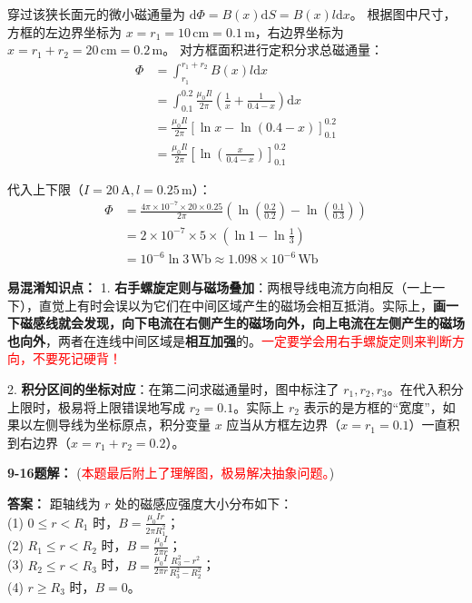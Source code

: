 穿过该狭长面元的微小磁通量为 $\mathrm{d}\Phi = B(x) \mathrm{d}S = B(x) l \mathrm{d}x$。
根据图中尺寸，方框的左边界坐标为 $x = r_1 = 10\,\text{cm} = 0.1\,\text{m}$，右边界坐标为 $x = r_1 + r_2 = 20\,\text{cm} = 0.2\,\text{m}$。
对方框面积进行定积分求总磁通量：
\begin{align*}
	\Phi &= \int_{r_1}^{r_1+r_2} B(x) l \mathrm{d}x \\
	&= \int_{0.1}^{0.2} \frac{\mu_0 I l}{2\pi} \left( \frac{1}{x} + \frac{1}{0.4-x} \right) \mathrm{d}x \\
	&= \frac{\mu_0 I l}{2\pi} \left[ \ln x - \ln(0.4-x) \right]_{0.1}^{0.2} \\
	&= \frac{\mu_0 I l}{2\pi} \left[ \ln\left(\frac{x}{0.4-x}\right) \right]_{0.1}^{0.2}
\end{align*}

代入上下限（$I = 20\,\text{A}, l = 0.25\,\text{m}$）：
\begin{align*}
	\Phi &= \frac{4\pi \times 10^{-7} \times 20 \times 0.25}{2\pi} \left( \ln\left(\frac{0.2}{0.2}\right) - \ln\left(\frac{0.1}{0.3}\right) \right) \\
	&= 2 \times 10^{-7} \times 5 \times (\ln 1 - \ln\frac{1}{3}) \\
	&= 10^{-6} \ln 3 \,\text{Wb} \approx 1.098 \times 10^{-6} \,\text{Wb}
\end{align*}

\textbf{易混淆知识点： }
1. \textbf{右手螺旋定则与磁场叠加}：两根导线电流方向相反（一上一下），直觉上有时会误以为它们在中间区域产生的磁场会相互抵消。实际上，\textbf{画一下磁感线就会发现，向下电流在右侧产生的磁场向外，向上电流在左侧产生的磁场也向外}，两者在连线中间区域是\textbf{相互加强}的。\textcolor{red}{一定要学会用右手螺旋定则来判断方向，不要死记硬背！}

2. \textbf{积分区间的坐标对应}：在第二问求磁通量时，图中标注了 $r_1, r_2, r_3$。在代入积分上限时，极易将上限错误地写成 $r_2=0.1$。实际上 $r_2$ 表示的是方框的“宽度”，如果以左侧导线为坐标原点，积分变量 $x$ 应当从方框左边界（$x=r_1=0.1$）一直积到右边界（$x=r_1+r_2=0.2$）。

\vspace{1em}

\textbf{9-16题解： }(\textcolor{red}{本题最后附上了理解图，极易解决抽象问题。})
\setcounter{equation}{0}
\renewcommand{\theHequation}{9-16.\arabic{equation}}

\textbf{答案： }
距轴线为 $r$ 处的磁感应强度大小分布如下：\\
(1) $0 \le r < R_1$ 时，$B = \frac{\mu_0 I r}{2\pi R_1^2}$；\\
(2) $R_1 \le r < R_2$ 时，$B = \frac{\mu_0 I}{2\pi r}$；\\
(3) $R_2 \le r < R_3$ 时，$B = \frac{\mu_0 I}{2\pi r} \frac{R_3^2 - r^2}{R_3^2 - R_2^2}$；\\
(4) $r \ge R_3$ 时，$B = 0$。

